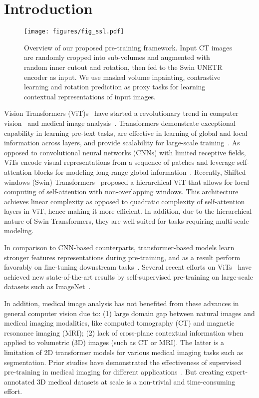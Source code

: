 \documentclass[10pt,twocolumn,letterpaper]{article}
\begin{document}
\section{Introduction}
\label{sec:intro}
\begin{figure}[t]
\texttt{[image: figures/fig\_ssl.pdf]}
\caption{Overview of our proposed pre-training framework. Input CT images are randomly cropped into sub-volumes and augmented with random inner cutout and rotation, then fed to the Swin UNETR encoder as input. We use masked volume inpainting, contrastive learning and rotation prediction as proxy tasks for learning contextual representations of input images.}
\label{fig:fig1}
\end{figure}
Vision Transformers (ViT)s~\cite{dosovitskiy2020image} have started a revolutionary trend in computer vision~\cite{zheng2021rethinking,cheng2021per} and medical image analysis~\cite{chen2021transunet,hatamizadeh2021unetr}. Transformers demonstrate exceptional capability in learning pre-text tasks, are effective in learning of global and local information across layers, and provide scalability for large-scale training~\cite{zhai2021scaling,raghu2021vision}. As opposed to convolutional neural networks (CNNs) with limited receptive fields, ViTs encode visual representations from a sequence of patches and leverage self-attention blocks for modeling long-range global information~\cite{raghu2021vision}. Recently, Shifted windows (Swin) Transformers~\cite{liu2021swin} proposed a hierarchical ViT that allows for local computing of self-attention with non-overlapping windows. This architecture achieves linear complexity as opposed to quadratic complexity of self-attention layers in ViT, hence making it more efficient. In addition, due to the hierarchical nature of Swin Transformers, they are well-suited for tasks requiring multi-scale modeling.

In comparison to CNN-based counterparts, transformer-based models learn stronger features representations during pre-training, and as a result perform favorably on fine-tuning downstream tasks~\cite{raghu2021vision}. Several recent efforts on ViTs~\cite{caron2021emerging,xie2021self} have achieved new state-of-the-art results by self-supervised pre-training on large-scale datasets such as ImageNet~\cite{deng2009imagenet}. 

In addition, medical image analysis has not benefited from these advances in general computer vision due to: (1) large domain gap between natural images and medical imaging modalities, like computed tomography (CT) and magnetic resonance imaging (MRI); (2) lack of cross-plane contextual information when applied to volumetric (3D) images (such as CT or MRI). The latter is a limitation of 2D transformer models for various medical imaging tasks such as segmentation. Prior studies have demonstrated the effectiveness of supervised pre-training in medical imaging for different applications~\cite{chen2019med3d, raghu2019transfusion}. But creating expert-annotated 3D medical datasets at scale is a non-trivial and time-consuming effort. 
\end{document}
